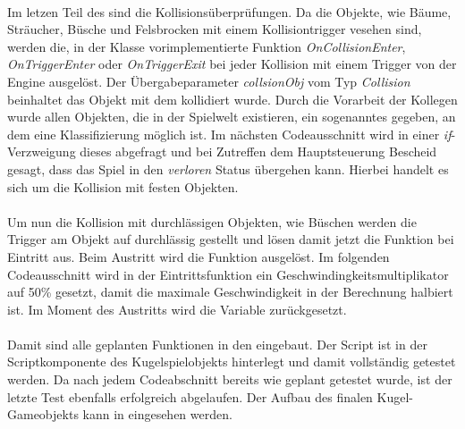\paragraph{}
Im letzen Teil des  sind die Kollisionsüberprüfungen. Da die Objekte, wie Bäume, Sträucher, Büsche und Felsbrocken mit einem Kollisiontrigger vesehen sind, werden die, in der  Klasse vorimplementierte Funktion \textit{OnCollisionEnter}, \textit{OnTriggerEnter} oder \textit{OnTriggerExit} bei jeder Kollision mit einem Trigger von der Engine ausgelöst. Der Übergabeparameter \textit{collsionObj} vom Typ \textit{Collision} beinhaltet das Objekt mit dem kollidiert wurde. Durch die Vorarbeit der Kollegen wurde allen Objekten, die in der Spielwelt existieren, ein sogenanntes  gegeben, an dem eine Klassifizierung möglich ist. Im nächsten Codeausschnitt wird in einer \textit{if}-Verzweigung dieses  abgefragt und bei Zutreffen dem Hauptsteuerung Bescheid gesagt, dass das Spiel in den \textit{verloren} Status übergehen kann. Hierbei handelt es sich um die Kollision mit festen Objekten.



\paragraph{}
Um nun die Kollision mit durchlässigen Objekten, wie Büschen werden die Trigger am Objekt auf durchlässig gestellt und lösen damit jetzt die  Funktion bei Eintritt aus. Beim Austritt wird die Funktion  ausgelöst. Im folgenden Codeausschnitt wird in der Eintrittsfunktion ein Geschwindingkeitsmultiplikator auf 50\% gesetzt, damit die maximale Geschwindigkeit in der Berechnung halbiert ist. Im Moment des Austritts wird die Variable zurückgesetzt.



\paragraph{}
Damit sind alle geplanten Funktionen in den  eingebaut. Der Script ist in der Scriptkomponente des Kugelspielobjekts hinterlegt und damit vollständig getestet werden. Da nach jedem Codeabschnitt bereits wie geplant getestet wurde, ist der letzte Test ebenfalls erfolgreich abgelaufen. Der Aufbau des finalen Kugel-Gameobjekts kann in  eingesehen werden.

